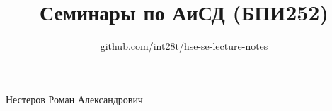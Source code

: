 \documentclass[a4paper,12pt]{article}
\title{Семинары по АиСД (БПИ252)}
\author{github.com/int28t/hse-se-lecture-notes}
\date{}
\begin{document}
    \pagestyle{empty}
	\maketitle
    \begin{flushright}
		Нестеров Роман Александрович
	\end{flushright}
	\tableofcontents{}
    \newpage
    \pagestyle{plain}

    
\end{document}
